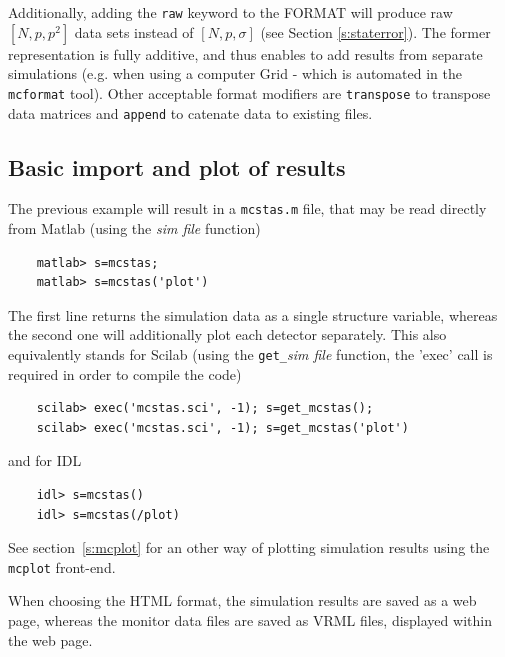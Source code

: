 Additionally, adding the \texttt{raw} keyword to the FORMAT will produce raw $[N, p, p^2]$ data sets instead of $[N, p, \sigma]$ (see Section \ref{s:staterror}). The former representation is fully additive, and thus enables to add results from separate simulations (e.g. when using a computer Grid - which is automated in the \verb+mcformat+ tool). Other acceptable format modifiers are \verb+transpose+ to transpose data matrices and \verb+append+ to catenate data to existing files.

\subsection{Basic import and plot of results}
\label{s:run-format}
The previous example will result in a \verb+mcstas.m+ file, that may be read directly from Matlab (using the {\it sim file} function)
\begin{lstlisting}
    matlab> s=mcstas;
    matlab> s=mcstas('plot')
\end{lstlisting} 
The first line returns the simulation data as a single structure variable, whereas the second one will additionally plot each detector separately.
This also equivalently stands for Scilab (using the \verb+get_+{\it sim file} function, the 'exec' call is required in order to compile the code)
\begin{lstlisting}
    scilab> exec('mcstas.sci', -1); s=get_mcstas();
    scilab> exec('mcstas.sci', -1); s=get_mcstas('plot')
\end{lstlisting} 
and for IDL
\begin{lstlisting}
    idl> s=mcstas()
    idl> s=mcstas(/plot)
\end{lstlisting} 
See section~\ref{s:mcplot} for an other way of plotting simulation results using the \verb+mcplot+ front-end. 

When choosing the HTML format, the simulation results are saved as a web page, whereas the monitor data files are saved as VRML files, displayed within the web page.

